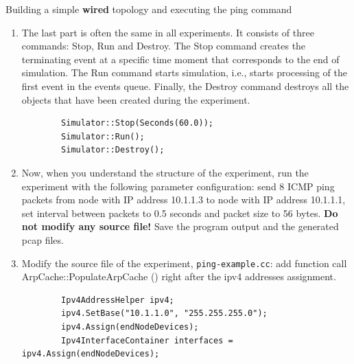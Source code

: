 \begin{exercise}{Building a simple \textbf{wired} topology and executing the ping command}
\begin{enumerate}
\begin{lstlisting}
		ethernet.EnablePcapAll("ping-example");
		\end{lstlisting}
		\remark Note that we do not install the ping tool on the receiver side. The tool is responsible for sending the ICMP echo requests, and output generation after interpreting the echo replies. However, generation of echo reply on a received echo request is a responsibility of ICMP protocol itself, so this procedure does not require the ping tool installation.
		
		
		\item The last part is often the same in all experiments. It consists of three commands: Stop, Run and Destroy. The Stop command creates the terminating event at a specific time moment that corresponds to the end of simulation. The Run command starts simulation, i.e., starts processing of the first event in the events queue. Finally, the Destroy command destroys all the objects that have been created during the experiment.
		\begin{lstlisting}
		Simulator::Stop(Seconds(60.0));
		Simulator::Run();
		Simulator::Destroy();
		\end{lstlisting}
		
		\item Now, when you understand the structure of the experiment, run the experiment with the following parameter configuration: send 8 ICMP ping packets from node with IP address 10.1.1.3 to node with IP address 10.1.1.1, set interval between packets to 0.5 seconds and packet size to 56 bytes. \textbf{Do not modify any source file!} Save the program output and the generated pcap files.
		
		
		
		\item Modify the source file of the experiment, \nolinkurl{ping-example.cc}: add function call \\ ArpCache::PopulateArpCache () right after the \ac{ipv4} addresses assignment.
		\begin{lstlisting}
		Ipv4AddressHelper ipv4;
		ipv4.SetBase("10.1.1.0", "255.255.255.0");
		ipv4.Assign(endNodeDevices);
		Ipv4InterfaceContainer interfaces = ipv4.Assign(endNodeDevices);
		

\end{lstlisting}
\end{enumerate}
\end{exercise}
